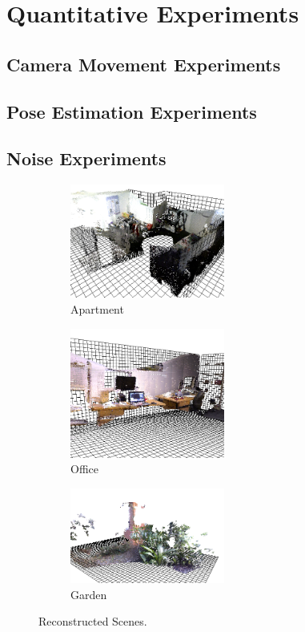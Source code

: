 \section{Quantitative Experiments}

\subsection{Camera Movement Experiments}

\subsection{Pose Estimation Experiments}

\subsection{Noise Experiments}




\begin{figure}[t] 
        \centering
        \begin{subfigure}[b]{2.0in}
                \includegraphics[width=2.0in]{images/ch2/unit21}
                \caption{Apartment}
                \label{fig:RECON_UNIT}
        \end{subfigure}%
        \begin{subfigure}[b]{2.0in}
                \includegraphics[width=2.0in]{images/ch2/officeA}
                \caption{Office}
                \label{fig:RECON_OFFICE}
        \end{subfigure}%
        \begin{subfigure}[b]{2.0in}
                \includegraphics[width=2.0in]{images/ch2/outdoorA}
                \caption{Garden}
                \label{fig:RECON_GARDEN}
        \end{subfigure}
       \caption{Reconstructed Scenes.}
       \label{fig:RECONSTRUCTIONS}
\end{figure}


